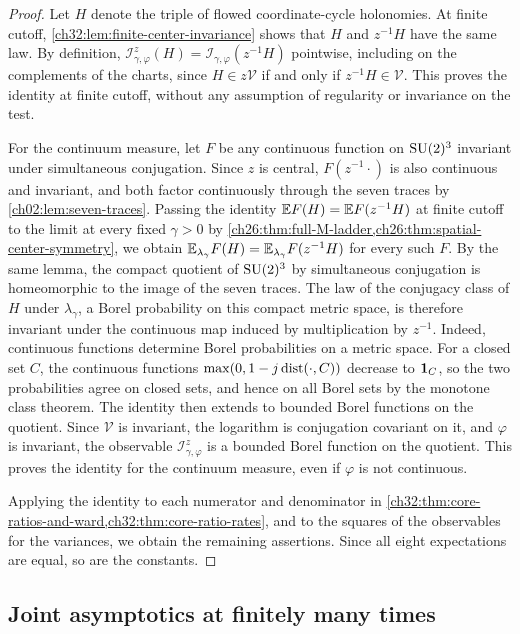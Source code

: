\begin{proof}
Let $H$ denote the triple of flowed coordinate-cycle holonomies. At finite cutoff, \cref{ch32:lem:finite-center-invariance} shows that $H$ and $z^{-1}H$ have the same law. By definition, $\mathcal I^z_{\gamma,\varphi}(H)=\mathcal I_{\gamma,\varphi}(z^{-1}H)$ pointwise, including on the complements of the charts, since $H\in z\mathcal V$ if and only if $z^{-1}H\in\mathcal V$. This proves the identity at finite cutoff, without any assumption of regularity or invariance on the test.

For the continuum measure, let $F$ be any continuous function on $\mathrm{SU}(2)^3$ invariant under simultaneous conjugation. Since $z$ is central, $F(z^{-1}\cdot)$ is also continuous and invariant, and both factor continuously through the seven traces by \cref{ch02:lem:seven-traces}. Passing the identity $\mathbb E F(H)=\mathbb E F(z^{-1}H)$ at finite cutoff to the limit at every fixed $\gamma>0$ by \cref{ch26:thm:full-M-ladder,ch26:thm:spatial-center-symmetry}, we obtain $\mathbb E_{\lambda_\gamma}F(H)=\mathbb E_{\lambda_\gamma}F(z^{-1}H)$ for every such $F$. By the same lemma, the compact quotient of $\mathrm{SU}(2)^3$ by simultaneous conjugation is homeomorphic to the image of the seven traces. The law of the conjugacy class of $H$ under $\lambda_\gamma$, a Borel probability on this compact metric space, is therefore invariant under the continuous map induced by multiplication by $z^{-1}$. Indeed, continuous functions determine Borel probabilities on a metric space. For a closed set $C$, the continuous functions $\max(0,1-j\operatorname{dist}(\cdot,C))$ decrease to $\mathbf 1_C$, so the two probabilities agree on closed sets, and hence on all Borel sets by the monotone class theorem. The identity then extends to bounded Borel functions on the quotient. Since $\mathcal V$ is invariant, the logarithm is conjugation covariant on it, and $\varphi$ is invariant, the observable $\mathcal I^z_{\gamma,\varphi}$ is a bounded Borel function on the quotient. This proves the identity for the continuum measure, even if $\varphi$ is not continuous.

Applying the identity to each numerator and denominator in \cref{ch32:thm:core-ratios-and-ward,ch32:thm:core-ratio-rates}, and to the squares of the observables for the variances, we obtain the remaining assertions. Since all eight expectations are equal, so are the constants.
\end{proof}

\subsection{Joint asymptotics at finitely many times}

